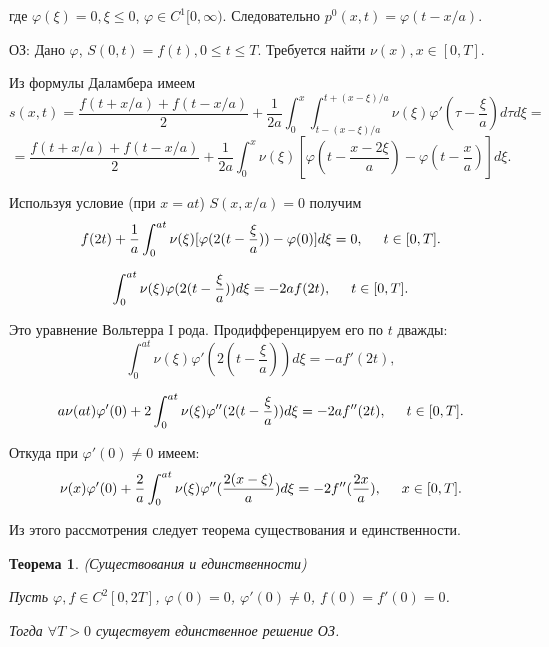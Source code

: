 \documentclass{article}
\newtheorem{theorem}{Теорема}
\begin{document}
где $\varphi(\xi) = 0, \xi \leqslant 0$, $\varphi \in C^1[0, \infty)$. Следовательно $p^0(x,t) = \varphi(t-x/a)$.

ОЗ: Дано $\varphi$, $S(0,t) = f(t), 0 \leqslant t \leqslant T$. Требуется найти $\nu(x), x \in [0,T]$.

Из формулы Даламбера имеем
\begin{equation*}
	s(x,t) = \dfrac{f(t + x/a) + f(t - x/a)}{2} +
	\dfrac{1}{2a} \int_0^x \int_{t-(x-\xi)/a}^{t+(x-\xi)/a} \nu(\xi) \varphi'(\tau - \frac{\xi}{a}) d\tau d\xi =
\end{equation*}
\begin{equation*}
	= \dfrac{f(t + x/a) + f(t - x/a)}{2} +
	\dfrac{1}{2a} \int_0^x \nu(\xi) [ \varphi(t - \frac{x-2\xi}{a}) - \varphi(t - \frac{x}{a})] d\xi.
\end{equation*}

Используя условие (при $x = at$) $S(x,x/a) = 0$ получим 
\begin{equation*}
	f(2t) + \dfrac{1}{a} \int_0^{at} \nu(\xi) [\varphi(2(t - \frac{\xi}{a})) - \varphi(0)] d\xi = 0,
	 \hspace{0.5cm} t \in [0,T].
\end{equation*}

\begin{equation*}
	\int_0^{at} \nu(\xi) \varphi(2(t - \frac{\xi}{a})) d\xi = - 2 a f(2t), 
	\hspace{0.5cm} t \in [0,T].
\end{equation*}

Это уравнение Вольтерра I рода. Продифференцируем его по $t$ дважды:
\begin{equation*}
	\int_0^{at} \nu(\xi) \varphi'(2(t - \frac{\xi}{a})) d\xi = -  a f'(2t),
\end{equation*}

\begin{equation*}
	a \nu(at) \varphi'(0) + 2 \int_0^{at} \nu(\xi) \varphi''(2(t - \frac{\xi}{a})) d\xi = - 2 a f''(2t), 
	\hspace{0.5cm} t \in [0,T].
\end{equation*}

Откуда при $\varphi'(0) \neq 0$ имеем:
\begin{equation*}
	\nu(x) \varphi'(0) + \dfrac{2}{a} \int_0^{at} \nu(\xi) \varphi''(\frac{2 (x - \xi)}{a}) d\xi = - 2 f''(\frac{2x}{a}), 
	\hspace{0.5cm} x \in [0,T].
\end{equation*}

Из этого рассмотрения следует теорема существования и единственности.

\begin{theorem}
(Существования и единственности)

Пусть $\varphi, f \in C^2[0,2T]$, $\varphi(0) = 0$, $\varphi'(0) \neq 0$, $f(0) = f'(0) = 0$.

Тогда $\forall T > 0$ существует единственное решение ОЗ.
\end{theorem}
\end{document}
